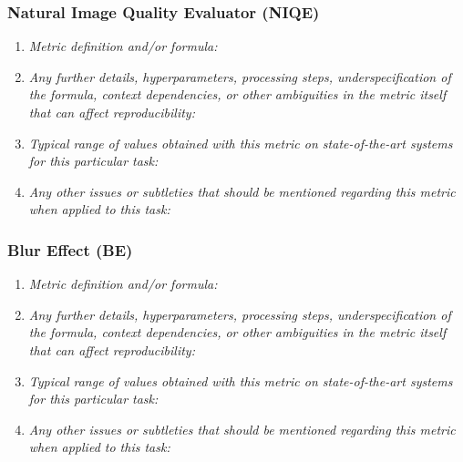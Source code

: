 \documentclass[a4paper,11pt]{article}
\begin{document}
        \subsubsection{Natural Image Quality Evaluator (NIQE)}
            \begin{enumerate}[label=\alph*.]
                \item \textit{Metric definition and/or formula:}
                \bigskip
                \item \textit{Any further details, hyperparameters, processing steps, underspecification of the formula, context dependencies, or other ambiguities in the metric itself that can affect reproducibility:}
                \bigskip
                \item \textit{Typical range of values obtained with this metric on state-of-the-art systems for this particular task:}
                \bigskip
                \item \textit{Any other issues or subtleties that should be mentioned regarding this metric when applied to this task:}
                \bigskip
            \end{enumerate}
        \subsubsection{Blur Effect (BE)}
            \begin{enumerate}[label=\alph*.]
                \item \textit{Metric definition and/or formula:}
                \bigskip
                \item \textit{Any further details, hyperparameters, processing steps, underspecification of the formula, context dependencies, or other ambiguities in the metric itself that can affect reproducibility:}
                \bigskip
                \item \textit{Typical range of values obtained with this metric on state-of-the-art systems for this particular task:}
                \bigskip
                \item \textit{Any other issues or subtleties that should be mentioned regarding this metric when applied to this task:}
                \bigskip
            \end{enumerate}
\end{document}
